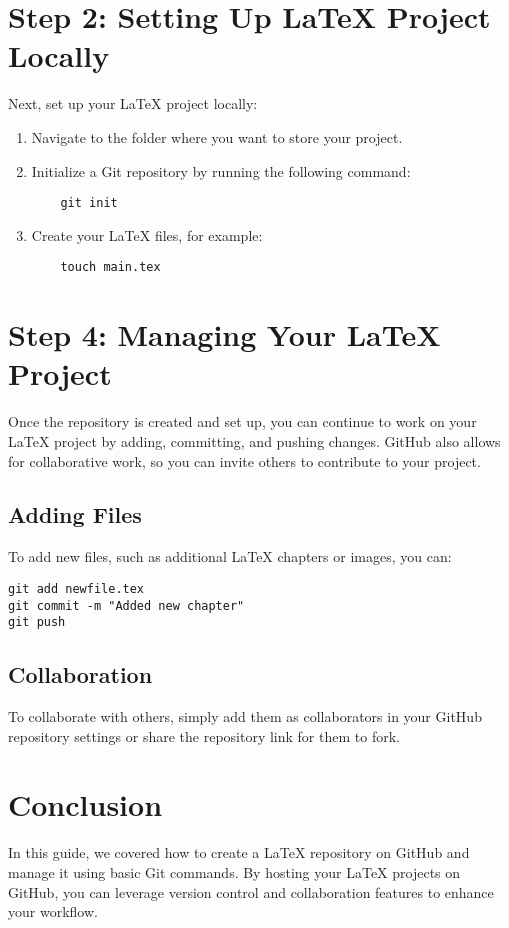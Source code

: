 \documentclass[a4paper,14pt]{article}
\begin{document}
\section{Step 2: Setting Up LaTeX Project Locally}
Next, set up your LaTeX project locally:
\begin{enumerate}
    \item Navigate to the folder where you want to store your project.
    \item Initialize a Git repository by running the following command:
    \begin{verbatim}
    git init
    \end{verbatim}
    \item Create your LaTeX files, for example:
    \begin{verbatim}
    touch main.tex
    \end{verbatim}
\end{enumerate}

\section{Step 4: Managing Your LaTeX Project}
Once the repository is created and set up, you can continue to work on your LaTeX project by adding, committing, and pushing changes. GitHub also allows for collaborative work, so you can invite others to contribute to your project.

\subsection{Adding Files}
To add new files, such as additional LaTeX chapters or images, you can:
\begin{verbatim}
git add newfile.tex
git commit -m "Added new chapter"
git push
\end{verbatim}

\subsection{Collaboration}
To collaborate with others, simply add them as collaborators in your GitHub repository settings or share the repository link for them to fork.

\section{Conclusion}
In this guide, we covered how to create a LaTeX repository on GitHub and manage it using basic Git commands. By hosting your LaTeX projects on GitHub, you can leverage version control and collaboration features to enhance your workflow.
\end{document}

